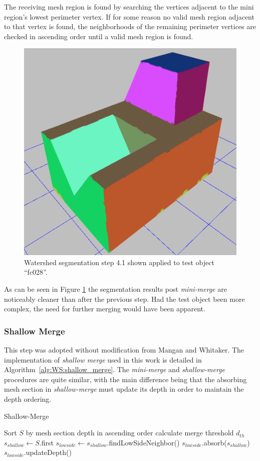 The receiving mesh region is found by searching the vertices adjacent to the mini region's lowest perimeter vertex.
If for some reason no valid mesh region adjacent to that vertex is found, the neighborhoods of the remaining perimeter vertices are checked in ascending order until a valid mesh region is found.

\begin{figure}[htb]
	\centering
	\includegraphics[width=0.5\linewidth]{../resources/watershed/fc028_WS4.1.png}
\caption{
Watershed segmentation step 4.1 shown applied to test object ``fc028''.
}
	\label{fig:ws_4.1}
\end{figure}

As can be seen in Figure \ref{fig:ws_4.1} the segmentation results post \textit{mini-merge} are noticeably cleaner than after the previous step.
Had the test object been more complex, the need for further merging would have been apparent.

\subsubsection{Shallow Merge}
This step was adopted without modification from Mangan and Whitaker.
The implementation of \textit{shallow merge} used in this work is detailed in Algorithm~\ref{alg:WS:shallow_merge}.
The \textit{mini-merge} and \textit{shallow-merge} procedures are quite similar, with the main difference being that the absorbing mesh section in \textit{shallow-merge} must update its depth in order to maintain the depth ordering.

\begin{algorithm}[!b]
\caption{Shallow-Merge}\label{alg:WS:shallow_merge}
\begin{algorithmic}[1]
		\State Sort $S$ by mesh section depth in ascending order
		\State calculate merge threshold $d_{th}$
			\State $s_{shallow} \leftarrow S$.first
			\State $s_{lowside} \leftarrow s_{shallow}$.findLowSideNeighbor()
			\State $s_{lowside}$.absorb($s_{shallow}$)
			\State $s_{lowside}$.updateDepth()
		\EndWhile
	\EndFunction
\end{algorithmic}
\end{algorithm}

